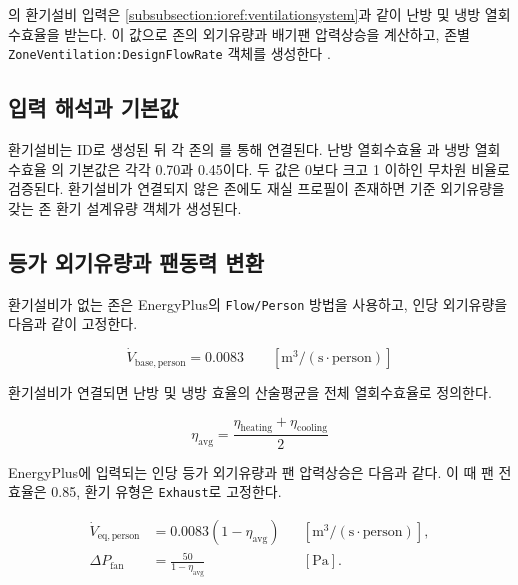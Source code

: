 \simulator 의 환기설비 입력은 \cref{subsubsection:ioref:ventilationsystem}과 같이 난방 및 냉방 열회수효율을 받는다. 이 값으로 존의 외기유량과 배기팬 압력상승을 계산하고, 존별 \texttt{ZoneVentilation:DesignFlowRate} 객체를 생성한다 \cite{energyplusior242}.

\subsection{입력 해석과 기본값}

환기설비는 ID로 생성된 뒤 각 존의 를 통해 연결된다. 난방 열회수효율 과 냉방 열회수효율 의 기본값은 각각 0.70과 0.45이다. 두 값은 0보다 크고 1 이하인 무차원 비율로 검증된다. 환기설비가 연결되지 않은 존에도 재실 프로필이 존재하면 기준 외기유량을 갖는 존 환기 설계유량 객체가 생성된다.

\subsection{등가 외기유량과 팬동력 변환}

환기설비가 없는 존은 EnergyPlus의 \texttt{Flow/Person} 방법을 사용하고, 인당 외기유량을 다음과 같이 고정한다.

\begin{equation}
  \dot V_{\mathrm{base,person}} = 0.0083 \qquad [\mathrm{m^3/(s\cdot person)}]
  \label{eq:ventilation-base-flow}
\end{equation}

환기설비가 연결되면 난방 및 냉방 효율의 산술평균을 전체 열회수효율로 정의한다.

\begin{equation}
  \eta_{\mathrm{avg}} = \frac{\eta_{\mathrm{heating}}+\eta_{\mathrm{cooling}}}{2}
  \label{eq:ventilation-average-efficiency}
\end{equation}

EnergyPlus에 입력되는 인당 등가 외기유량과 팬 압력상승은 다음과 같다. 이 때 팬 전효율은 0.85, 환기 유형은 \texttt{Exhaust}로 고정한다. 

\begin{align}
  \dot V_{\mathrm{eq,person}} &= 0.0083\left(1-\eta_{\mathrm{avg}}\right)
  && [\mathrm{m^3/(s\cdot person)}],
  \label{eq:ventilation-equivalent-flow} \\
  \Delta P_{\mathrm{fan}} &= \frac{50}{1-\eta_{\mathrm{avg}}}
  && [\mathrm{Pa}].
  \label{eq:ventilation-fan-pressure}
\end{align}


